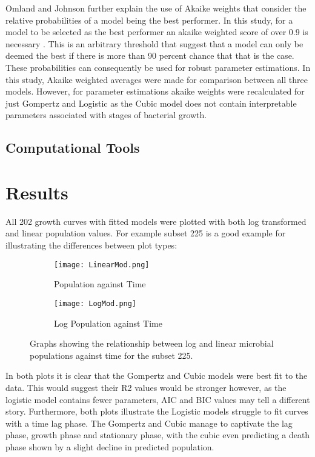 \documentclass[11pt]{article}
\begin{document}
Omland and Johnson further explain the use of Akaike weights that consider the relative probabilities of a model being the best performer. In this study, for a model to be selected as the best performer an akaike weighted score of over 0.9 is necessary \cite{DASH2023103140}. This is an arbitrary threshold that suggest that a model can only be deemed the best if there is more than 90 percent chance that that is the case. These probabilities can consequently be used for robust parameter estimations. In this study, Akaike weighted averages were made for comparison between all three models. However, for parameter estimations akaike weights were recalculated for just Gompertz and Logistic as the Cubic model does not contain interpretable parameters associated with stages of bacterial growth.

    \subsection{Computational Tools}

\section{Results}
All 202 growth curves with fitted models were plotted with both log transformed and linear population values. For example subset 225 is a good example for illustrating the differences between plot types:\\

\begin{figure}[htbp]
    \centering
    \begin{subfigure}{0.5\textwidth}
      \texttt{[image: LinearMod.png]}
      \caption{Population against Time}
    \end{subfigure}%
    \begin{subfigure}{0.5\textwidth}
      \texttt{[image: LogMod.png]}
      \caption{Log Population against Time}
    \end{subfigure}
    \caption{Graphs showing the relationship between log and linear microbial populations against time for the subset 225.}
\end{figure}

In both plots it is clear that the Gompertz and Cubic models were best fit to the data. This would suggest their R2 values would be stronger however, as the logistic model contains fewer parameters, AIC and BIC values may tell a different story. Furthermore, both plots illustrate the Logistic models struggle to fit curves with a time lag phase. The Gompertz and Cubic manage to captivate the lag phase, growth phase and stationary phase, with the cubic even predicting a death phase shown by a slight decline in predicted population.\\
\end{document}
